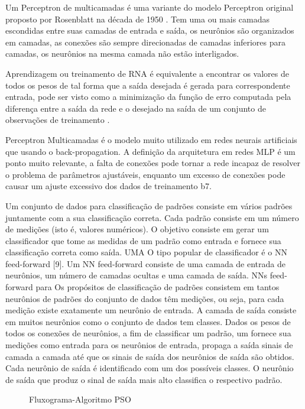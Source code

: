 \documentclass[conference]{IEEEtran}
\begin{document}
Um Perceptron de multicamadas é uma variante do modelo Perceptron original proposto por Rosenblatt na década de 1950 \cite{b9}. Tem uma ou mais camadas escondidas entre suas camadas de entrada e saída, os neurônios são organizados em camadas, as conexões são sempre direcionadas de camadas inferiores para camadas, os neurônios na mesma camada não estão interligados.

Aprendizagem ou treinamento de RNA é equivalente a encontrar os valores de todos os pesos de tal forma que a saída desejada é gerada para correspondente entrada, pode ser visto como a minimização da função de erro computada pela diferença entre a saída da rede e o desejado na saída de um conjunto de observações de treinamento \cite{b6}.

Perceptron Multicamadas é o modelo muito utilizado em redes neurais artificiais que usando o back-propagation. A definição da arquitetura em redes MLP é um ponto muito relevante, a falta de conexões pode tornar a rede incapaz de resolver o problema de parâmetros ajustáveis, enquanto um excesso de conexões pode causar um ajuste excessivo dos dados de treinamento {b7}.



Um conjunto de dados para classificação de padrões consiste em vários padrões
juntamente com a sua classificação correta. Cada padrão consiste em um
número de medições (isto é, valores numéricos).
O objetivo consiste em gerar um classificador que tome as medidas
de um padrão como entrada e fornece sua classificação correta como saída. UMA
O tipo popular de classificador é o NN feed-forward [9].
Um NN feed-forward consiste de uma camada de entrada de neurônios, um
número de camadas ocultas e uma camada de saída. NNs feed-forward para
Os propósitos de classificação de padrões consistem em tantos neurônios de
padrões do conjunto de dados têm medições, ou seja, para cada medição
existe exatamente um neurônio de entrada. A camada de saída consiste em
muitos neurônios como o conjunto de dados tem classes. Dados os pesos de todos os
conexões de neurônios, a fim de classificar um padrão, um fornece sua
medições como entrada para os neurônios de entrada, propaga a saída
sinais de camada a camada até que os sinais de saída dos neurônios de saída
são obtidos. Cada neurônio de saída é identificado com um dos possíveis
classes. O neurônio de saída que produz o sinal de saída mais alto
classifica o respectivo padrão.



	
	\begin{figure}[htbp]
	\caption{Fluxograma-Algoritmo PSO}
	\label{fig}
	\end{figure}
	
\end{document}
